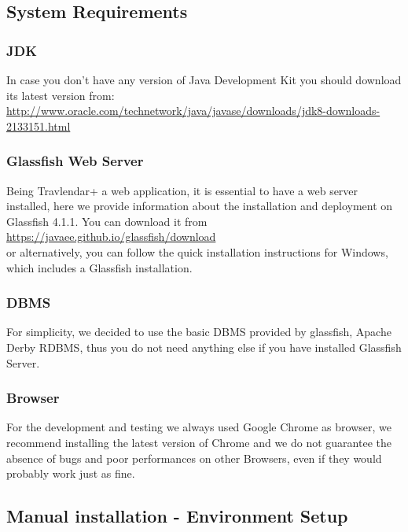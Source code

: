 \clearpage
\subsection{System Requirements}

\subsubsection{JDK}
In case you don't have any version of Java Development Kit you should download its latest version from:
\\
\href{url}{http://www.oracle.com/technetwork/java/javase/downloads/jdk8-downloads-2133151.html}

\subsubsection{Glassfish Web Server}
Being Travlendar+ a web application, it is essential to have a web server installed, here we provide information about the installation and deployment on Glassfish 4.1.1. You can download it from
\\
\href{url}{https://javaee.github.io/glassfish/download}
\\or alternatively, you can follow the quick installation instructions for Windows, which includes a Glassfish installation.

\subsubsection{DBMS}
For simplicity, we decided to use the basic DBMS provided by glassfish, Apache Derby RDBMS, thus you do not need anything else if you have installed Glassfish Server.

\subsubsection{Browser}
For the development and testing we always used Google Chrome as browser, we recommend installing the latest version of Chrome and we do not guarantee the absence of bugs and poor performances on other Browsers, even if they would probably work just as fine.






\subsection{Manual installation - Environment Setup}
